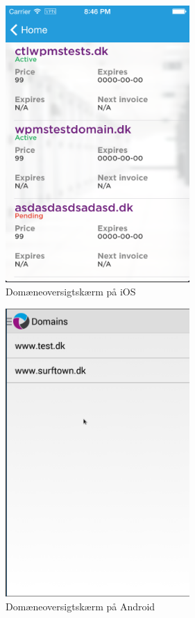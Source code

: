 \documentclass[12pt]{article}
\begin{document}
\begin{figure}[h]
	\centering
	\includegraphics[width=7cm]{ios/domains.png}
	\caption{Domæneoversigtskærm på iOS}
\end{figure}
\newpage
\begin{figure}[h]
	\centering
	\includegraphics[width=7cm]{screenshots/domains.png}
	\caption{Domæneoversigtskærm på Android}
\end{figure}
\newpage
\end{document}
